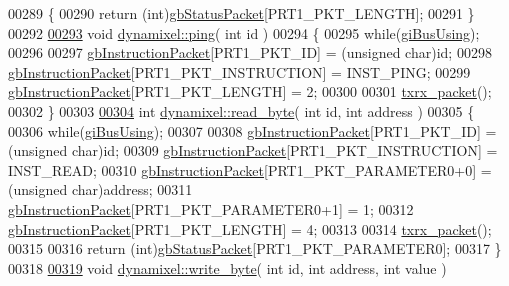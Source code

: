 \begin{DoxyCode}
00289 \{
00290     \textcolor{keywordflow}{return} (\textcolor{keywordtype}{int})\hyperlink{a00003_aa57c86d3bbbeaf5c9d4f6bd00376b04f}{gbStatusPacket}[PRT1\_PKT\_LENGTH];
00291 \}
00292 
\hypertarget{a00012_source_l00293}{}\hyperlink{a00003_af2bd714423e7c4fc089762805c0c71f3}{00293} \textcolor{keywordtype}{void} \hyperlink{a00003_af2bd714423e7c4fc089762805c0c71f3}{dynamixel::ping}( \textcolor{keywordtype}{int} \textcolor{keywordtype}{id} )
00294 \{
00295     \textcolor{keywordflow}{while}(\hyperlink{a00003_ad10e0e49f5fef04bf789a89c14cc470a}{giBusUsing});
00296 
00297     \hyperlink{a00003_afd94dcf01b8e96298727776e222de722}{gbInstructionPacket}[PRT1\_PKT\_ID] = (\textcolor{keywordtype}{unsigned} char)\textcolor{keywordtype}{id};
00298     \hyperlink{a00003_afd94dcf01b8e96298727776e222de722}{gbInstructionPacket}[PRT1\_PKT\_INSTRUCTION] = INST\_PING;
00299     \hyperlink{a00003_afd94dcf01b8e96298727776e222de722}{gbInstructionPacket}[PRT1\_PKT\_LENGTH] = 2;
00300     
00301     \hyperlink{a00003_aebfc569c6b1eb0b98f8c385f0f921fc0}{txrx\_packet}();
00302 \}
00303 
\hypertarget{a00012_source_l00304}{}\hyperlink{a00003_a888404b41c4c4395a0b745c77ff2cea9}{00304} \textcolor{keywordtype}{int} \hyperlink{a00003_a888404b41c4c4395a0b745c77ff2cea9}{dynamixel::read\_byte}( \textcolor{keywordtype}{int} \textcolor{keywordtype}{id}, \textcolor{keywordtype}{int} address )
00305 \{
00306     \textcolor{keywordflow}{while}(\hyperlink{a00003_ad10e0e49f5fef04bf789a89c14cc470a}{giBusUsing});
00307 
00308     \hyperlink{a00003_afd94dcf01b8e96298727776e222de722}{gbInstructionPacket}[PRT1\_PKT\_ID] = (\textcolor{keywordtype}{unsigned} char)\textcolor{keywordtype}{id};
00309     \hyperlink{a00003_afd94dcf01b8e96298727776e222de722}{gbInstructionPacket}[PRT1\_PKT\_INSTRUCTION] = INST\_READ;
00310     \hyperlink{a00003_afd94dcf01b8e96298727776e222de722}{gbInstructionPacket}[PRT1\_PKT\_PARAMETER0+0] = (\textcolor{keywordtype}{unsigned} char)address;
00311     \hyperlink{a00003_afd94dcf01b8e96298727776e222de722}{gbInstructionPacket}[PRT1\_PKT\_PARAMETER0+1] = 1;
00312     \hyperlink{a00003_afd94dcf01b8e96298727776e222de722}{gbInstructionPacket}[PRT1\_PKT\_LENGTH] = 4;
00313     
00314     \hyperlink{a00003_aebfc569c6b1eb0b98f8c385f0f921fc0}{txrx\_packet}();
00315 
00316     \textcolor{keywordflow}{return} (\textcolor{keywordtype}{int})\hyperlink{a00003_aa57c86d3bbbeaf5c9d4f6bd00376b04f}{gbStatusPacket}[PRT1\_PKT\_PARAMETER0];
00317 \}
00318 
\hypertarget{a00012_source_l00319}{}\hyperlink{a00003_a66c1e32cc45dd46d329f1fc212e46a3d}{00319} \textcolor{keywordtype}{void} \hyperlink{a00003_a66c1e32cc45dd46d329f1fc212e46a3d}{dynamixel::write\_byte}( \textcolor{keywordtype}{int} \textcolor{keywordtype}{id}, \textcolor{keywordtype}{int} address, \textcolor{keywordtype}{int} value )

\end{DoxyCode}
